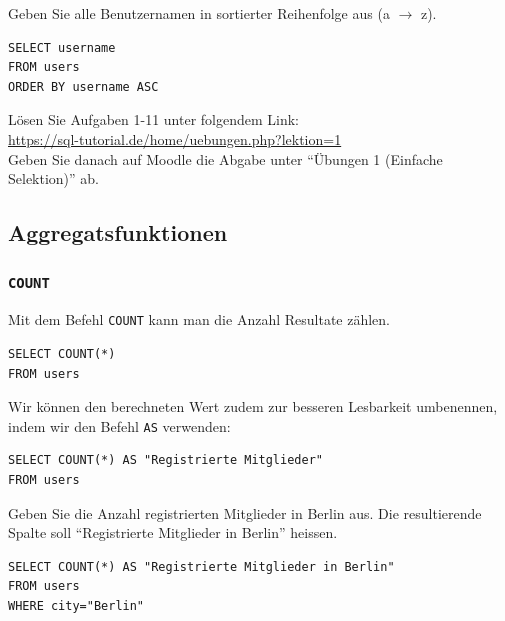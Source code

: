 \begin{myexercise}
  Geben Sie alle Benutzernamen in sortierter Reihenfolge aus (a $\rightarrow$ z).
  \begin{myanswer}
    \begin{lstlisting}[style=sql]
SELECT username
FROM users
ORDER BY username ASC
\end{lstlisting}
  \end{myanswer}
\end{myexercise}

\begin{mysubmission}
Lösen Sie Aufgaben 1-11 unter folgendem Link:\\
\url{https://sql-tutorial.de/home/uebungen.php?lektion=1}\\
Geben Sie danach auf Moodle die Abgabe unter ``Übungen 1 (Einfache Selektion)'' ab.
\end{mysubmission}

\subsection{Aggregatsfunktionen}

\subsubsection{\texorpdfstring{\lstinline[style=sql]|COUNT|}{COUNT}}

Mit dem Befehl \lstinline[style=sql]|COUNT| kann man die Anzahl Resultate zählen.

\begin{lstlisting}[style=sql]
SELECT COUNT(*)
FROM users
\end{lstlisting}

Wir können den berechneten Wert zudem zur besseren Lesbarkeit umbenennen, indem wir den Befehl \lstinline[style=sql]|AS| verwenden:

\begin{lstlisting}[style=sql]
SELECT COUNT(*) AS "Registrierte Mitglieder" 
FROM users
\end{lstlisting}

\begin{myexercise}
  Geben Sie die Anzahl registrierten Mitglieder in Berlin aus. Die resultierende Spalte soll ``Registrierte Mitglieder in Berlin'' heissen.
  \begin{myanswer}
    \begin{lstlisting}[style=sql]
SELECT COUNT(*) AS "Registrierte Mitglieder in Berlin" 
FROM users
WHERE city="Berlin"
\end{lstlisting}
  \end{myanswer}
\end{myexercise}

